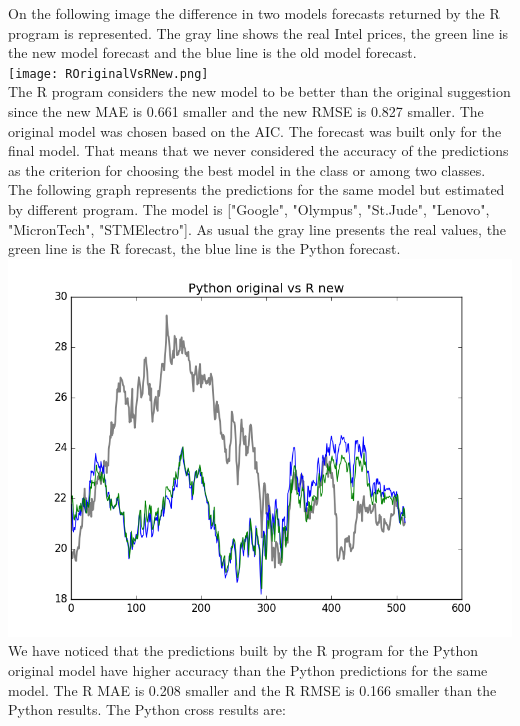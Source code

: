 \documentclass[
  twoside,
  11pt, a4paper,
  footinclude=true,
  headinclude=true,
  cleardoublepage=empty
]{scrreprt}
\begin{document}
    On the following image the difference in two models forecasts returned by the R program is represented. The gray line shows the real Intel prices, the green line is the new model forecast and the blue line is the old model forecast.\\
    \texttt{[image: ROriginalVsRNew.png]}\\
    The R program considers the new model to be better than the original suggestion since the new MAE is 0.661 smaller and the new RMSE is 0.827 smaller. The original model was chosen based on the AIC. The forecast was built only for the final model. That means that we never considered the accuracy of the predictions as the criterion for choosing the best model in the class or among two classes.\\
    The following graph represents the predictions for the same model but estimated by different program. The model is ["Google", "Olympus", "St.Jude", "Lenovo", "MicronTech", "STMElectro"]. As usual the gray line presents the real values, the green line is the R forecast, the blue line is the Python forecast.\\
    \includegraphics[scale=0.75]{PythonOriginalVsRNew.png}
    We have noticed that the predictions built by the R program for the Python original model have higher accuracy than the Python predictions for the same model. The R MAE is 0.208 smaller and the R RMSE is 0.166 smaller than the Python results.
    The Python cross results are:
\end{document}
